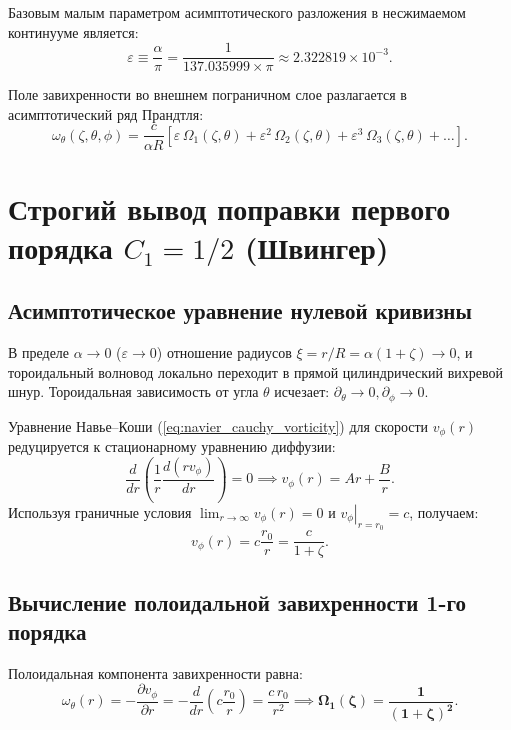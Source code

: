 \documentclass[12pt,a4paper]{article}
\begin{document}
	Базовым малым параметром асимптотического разложения в несжимаемом континууме является:
	\begin{equation}
		\varepsilon \equiv \frac{\alpha}{\pi} = \frac{1}{137.035999 \times \pi} \approx 2.322819 \times 10^{-3}.
	\end{equation}
	
	Поле завихренности во внешнем пограничном слое разлагается в асимптотический ряд Прандтля:
	\begin{equation}
		\omega_\theta(\zeta, \theta, \phi) = \frac{c}{\alpha R} \left[ \varepsilon \, \Omega_1(\zeta, \theta) + \varepsilon^2 \, \Omega_2(\zeta, \theta) + \varepsilon^3 \, \Omega_3(\zeta, \theta) + \dots \right].
		\label{eq:prandtl_expansion}
	\end{equation}
	
	\section{Строгий вывод поправки первого порядка $C_1 = 1/2$ (Швингер)}
	
	\subsection{Асимптотическое уравнение нулевой кривизны}
	В пределе $\alpha \to 0$ ($\varepsilon \to 0$) отношение радиусов $\xi = r/R = \alpha(1+\zeta) \to 0$, и тороидальный волновод локально переходит в прямой цилиндрический вихревой шнур. Тороидальная зависимость от угла $\theta$ исчезает: $\partial_\theta \to 0, \partial_\phi \to 0$.
	
	Уравнение Навье--Коши (\ref{eq:navier_cauchy_vorticity}) для скорости $v_\phi(r)$ редуцируется к стационарному уравнению диффузии:
	\begin{equation}
		\frac{d}{dr}\left( \frac{1}{r} \frac{d(r v_\phi)}{dr} \right) = 0 \implies v_\phi(r) = A r + \frac{B}{r}.
	\end{equation}
	Используя граничные условия $\lim_{r \to \infty} v_\phi(r) = 0$ и $\left. v_\phi \right|_{r = r_0} = c$, получаем:
	\begin{equation}
		v_\phi(r) = c \frac{r_0}{r} = \frac{c}{1 + \zeta}.
	\end{equation}
	
	\subsection{Вычисление полоидальной завихренности 1-го порядка}
	Полоидальная компонента завихренности равна:
	\begin{equation}
		\omega_\theta(r) = -\frac{\partial v_\phi}{\partial r} = -\frac{d}{dr}\left( c \frac{r_0}{r} \right) = \frac{c \, r_0}{r^2} \implies \mathbf{\Omega_1(\zeta) = \frac{1}{(1 + \zeta)^2}}.
	\end{equation}
	
\end{document}
